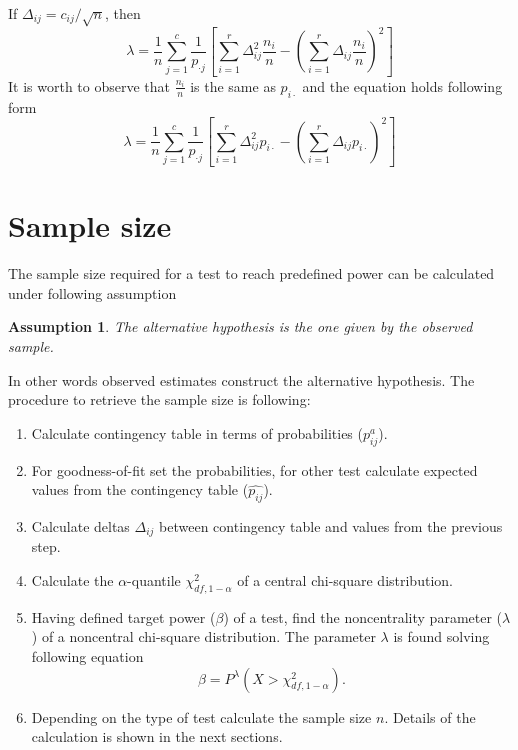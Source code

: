 \documentclass{article}
\newtheorem{assumption}{Assumption}
\begin{document}
If $\Delta_{ij} = c_{ij}/\sqrt{n}$, then 
\begin{equation}
    \lambda = \frac{1}{n}\sum_{j=1}^{c}\frac{1}{p_{\cdot j}}\left[ \sum_{i=1}^{r} \Delta_{ij}^2 \frac{n_i}{n} -  \left(\sum_{i=1}^{r} \Delta_{ij} \frac{n_i}{n}\right)^2  \right]
\end{equation}
It is worth to observe that $\frac{n_i}{n}$ is the same as $p_{i\cdot}$ and the equation holds following form
\begin{equation}\label{homogeneity_lambda}
    \lambda = \frac{1}{n}\sum_{j=1}^{c}\frac{1}{p_{\cdot j}}\left[ \sum_{i=1}^{r} \Delta_{ij}^2 p_{i\cdot} -  \left(\sum_{i=1}^{r} \Delta_{ij} p_{i\cdot}\right)^2  \right]
\end{equation}

\section{Sample size}
The sample size required for a test to reach predefined power can be calculated
under following assumption 

\begin{assumption}
The alternative hypothesis is the one given by the observed sample. 
\end{assumption} 
In other words observed estimates construct the alternative hypothesis. The 
procedure to retrieve the sample size is following:

\begin{enumerate}
    \item Calculate contingency table in terms of probabilities ($p^a_{ij}$).
    \item For goodness-of-fit set the probabilities, for other test calculate expected values from the contingency table ($\widehat{p_{ij}}$).
    \item Calculate deltas $\Delta_{ij}$ between contingency table and values from the previous step.
    \item Calculate the $\alpha$-quantile $\chi^2_{df,1-\alpha}$ of a central chi-square distribution.
    \item Having defined target power ($\beta$) of a test, find the noncentrality parameter ($\lambda$) of a noncentral chi-square distribution. 
    The parameter $\lambda$ is found solving following equation
    \begin{equation}
        \beta = P^\lambda\left(X > \chi^2_{df,1-\alpha} \right).
    \end{equation}
    \item Depending on the type of test calculate the sample size $n$. Details of the calculation is shown in the next sections.
\end{enumerate}
\end{document}
